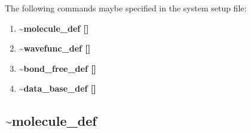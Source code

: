 \documentclass[12pt,titlepage]{article}
\begin{document}
The following commands maybe specified in the system setup file:
\begin{enumerate}
\item {\bf \~{}molecule\_def []}
\item {\bf \~{}wavefunc\_def []}
\item {\bf \~{}bond\_free\_def []}
\item {\bf \~{}data\_base\_def []}
\end{enumerate}


\newpage
\subsection*{\bf \~{}molecule\_def}
\end{document}
